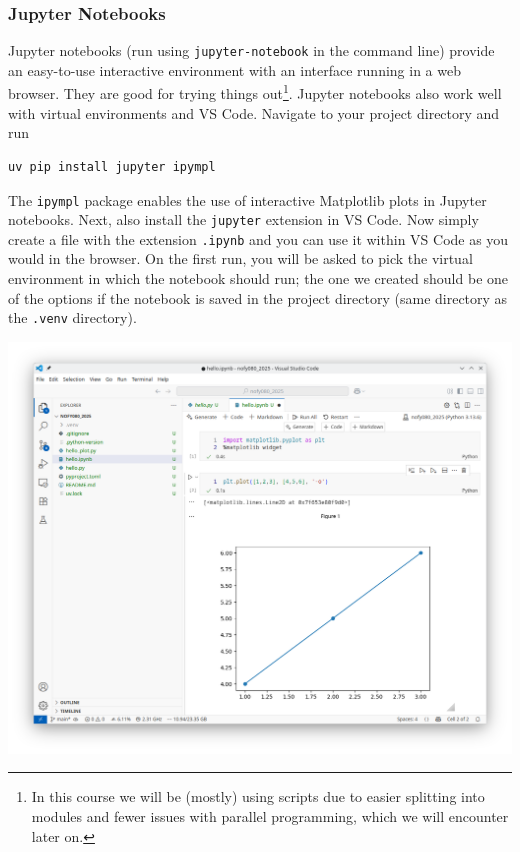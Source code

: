 \subsubsection{Jupyter Notebooks}
Jupyter notebooks (run using \verb|jupyter-notebook| in the command line) provide an easy-to-use interactive environment with an interface running in a web browser. They are good for trying things out\footnote{In this course we will be (mostly) using scripts due to easier splitting into modules and fewer issues with parallel programming, which we will encounter later on.}. Jupyter notebooks also work well with virtual environments and VS Code. Navigate to your project directory and run
\begin{lstlisting}
uv pip install jupyter ipympl
\end{lstlisting}
The \verb|ipympl| package enables the use of interactive Matplotlib plots in Jupyter notebooks. Next, also install the \verb|jupyter| extension in VS Code. Now simply create a file with the extension \verb|.ipynb| and you can use it within VS Code as you would in the browser. On the first run, you will be asked to pick the virtual environment in which the notebook should run; the one we created should be one of the options if the notebook is saved in the project directory (same directory as the \verb|.venv| directory).

\begin{center}
    \includegraphics[width=0.9\linewidth]{vscode_jupyter.png}
\end{center}